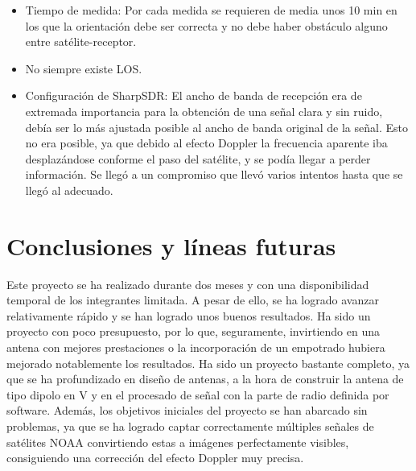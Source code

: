 \documentclass[a4paper,openright,12pt]{article}
\begin{document}
\begin{itemize}
\begin{itemize}
        \item Tiempo de medida: Por cada medida se requieren de media unos 10 min en los que la orientación debe ser correcta y no debe haber obstáculo alguno entre satélite-receptor.
        \item No siempre existe LOS.
        \item Configuración de SharpSDR: El ancho de banda de recepción era de extremada importancia para la obtención de una señal clara y sin ruido, debía ser lo más ajustada posible al ancho de banda original de la señal. Esto no era posible, ya que debido al efecto Doppler la frecuencia aparente iba desplazándose conforme el paso del satélite, y se podía llegar a perder información. Se llegó a un compromiso que llevó varios intentos hasta que se llegó al adecuado.
    \end{itemize}
    
\end{itemize}

\newpage
\section{Conclusiones y líneas futuras}

Este proyecto se ha realizado durante dos meses y con una disponibilidad temporal de los integrantes limitada. A pesar de ello, se ha logrado avanzar relativamente rápido y se han logrado unos buenos resultados. Ha sido un proyecto con poco presupuesto, por lo que, seguramente, invirtiendo en una antena con mejores prestaciones o la incorporación de un empotrado hubiera mejorado notablemente los resultados.
Ha sido un proyecto bastante completo, ya que se ha profundizado en diseño de antenas, a la hora de construir la antena de tipo dipolo en V y en el procesado de señal con la parte de radio definida por software. Además, los objetivos iniciales del proyecto se han abarcado sin problemas, ya que se ha logrado captar correctamente múltiples señales de satélites NOAA convirtiendo estas a imágenes perfectamente visibles, consiguiendo una corrección del efecto Doppler muy precisa.
\end{document}
